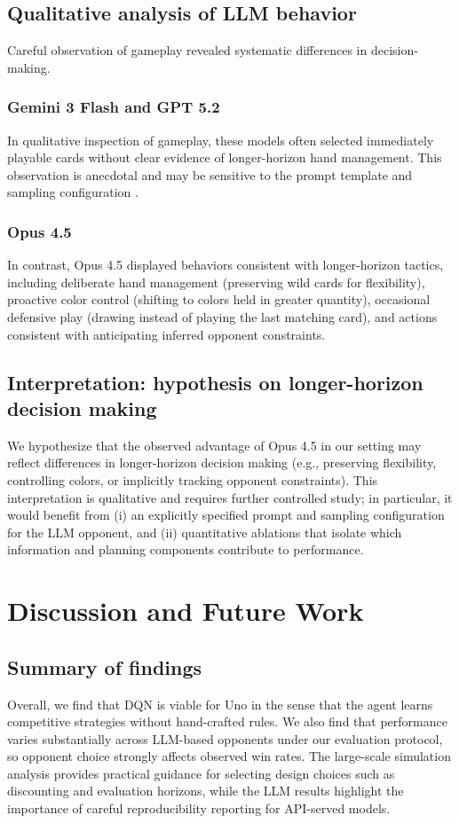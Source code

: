 \documentclass[11pt]{article}
\begin{document}
\subsection{Qualitative analysis of LLM behavior}
Careful observation of gameplay revealed systematic differences in decision-making.

\FloatBarrier
\subsubsection{Gemini 3 Flash and GPT 5.2}
In qualitative inspection of gameplay, these models often selected immediately playable cards without clear evidence of longer-horizon hand management. This observation is anecdotal and may be sensitive to the prompt template and sampling configuration \parencite{policyuno_repo}.

\subsubsection{Opus 4.5}
In contrast, Opus 4.5 displayed behaviors consistent with longer-horizon tactics, including deliberate hand management (preserving wild cards for flexibility), proactive color control (shifting to colors held in greater quantity), occasional defensive play (drawing instead of playing the last matching card), and actions consistent with anticipating inferred opponent constraints.

\subsection{Interpretation: hypothesis on longer-horizon decision making}
We hypothesize that the observed advantage of Opus 4.5 in our setting may reflect differences in longer-horizon decision making (e.g., preserving flexibility, controlling colors, or implicitly tracking opponent constraints). This interpretation is qualitative and requires further controlled study; in particular, it would benefit from (i) an explicitly specified prompt and sampling configuration for the LLM opponent, and (ii) quantitative ablations that isolate which information and planning components contribute to performance.


\FloatBarrier
\section{Discussion and Future Work}
\subsection{Summary of findings}
Overall, we find that DQN is viable for Uno in the sense that the agent learns competitive strategies without hand-crafted rules. We also find that performance varies substantially across LLM-based opponents under our evaluation protocol, so opponent choice strongly affects observed win rates. The large-scale simulation analysis provides practical guidance for selecting design choices such as discounting and evaluation horizons, while the LLM results highlight the importance of careful reproducibility reporting for API-served models.
\end{document}
